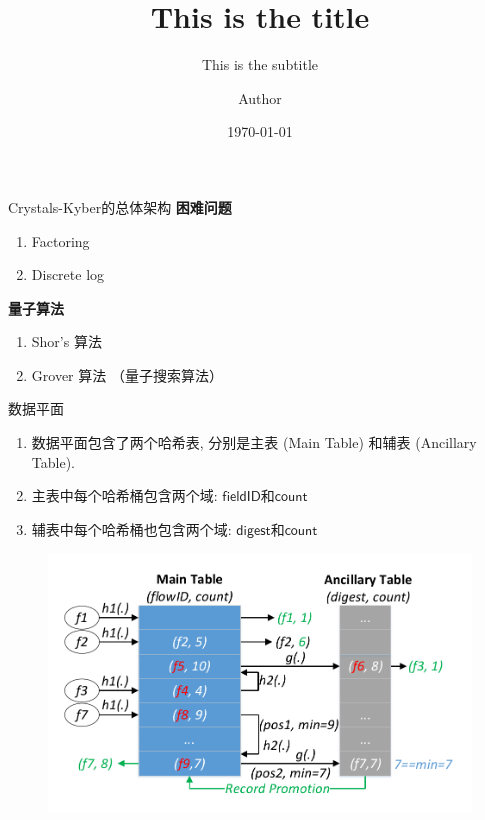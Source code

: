 \documentclass{beamer}
\title{This is the title}
\subtitle{This is the subtitle}
\author{Author}
\institute{中国科学院软件研究所}
\date{\today} %
\newcommand{\system}{Crystals-Kyber}
\newcommand{\field}{\mathsf}
\begin{document}
{ 
\frame{\titlepage}}



\begin{frame}{{\system}的总体架构}
\textbf{困难问题}
\begin{enumerate}
\item Factoring
\item Discrete log
\end{enumerate}
\textbf{量子算法}
\begin{enumerate}
\item Shor's 算法
\item Grover 算法 （量子搜索算法）
\end{enumerate}
\end{frame}

\begin{frame}{数据平面}
\begin{enumerate}
\item 数据平面包含了两个哈希表, 分别是主表 (Main Table) 和辅表 (Ancillary Table).
\item 主表中每个哈希桶包含两个域: $\field{fieldID}$和$\field{count}$
\item 辅表中每个哈希桶也包含两个域: $\field{digest}$和$\field{count}$
\end{enumerate}
\begin{figure}
	\centering
	\includegraphics[width=0.6\linewidth]{figures/representation/datastructure}
\end{figure}

\end{frame}

\end{document}
